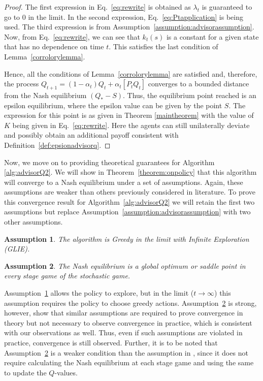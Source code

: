 \documentclass[jair, twoside,11pt,theapa]{article}
\newtheorem{assumption}{Assumption}
\begin{document}
\begin{proof}
The first expression in Eq.~\ref{eq:rewrite} is obtained as $\lambda_t$ is guaranteed to go to 0 in the limit. In the second expression, Eq.~\ref{eq:Ptapplication} is being used. The third expression is from Assumption~\ref{assumption:advisorassumption}. Now, from Eq.~\ref{eq:rewrite}, we can see that $k_t(s)$ is a constant for a given state that has no dependence on time $t$. This satisfies the last condition of Lemma~\ref{corrolorylemma}. 

Hence, all the conditions of Lemma~\ref{corrolorylemma} are satisfied and, therefore, the process $ Q_{t+1} = (1 - \alpha_t) Q_t + \alpha_t[P_t Q_t]$ converges to a bounded distance from the Nash equilibrium $(Q_{*} - S)$. Thus, the equilibrium point reached is an epsilon equilibrium, where the epsilon value can be given by the point $S$. The expression for this point is as given in Theorem \ref{maintheorem} with the value of $K$ being given in Eq.~\ref{eq:rewrite}. Here the agents can still unilaterally deviate and possibly obtain an additional payoff consistent with Definition~\ref{def:epsionadvisorq}.
\end{proof}




Now, we move on to providing theoretical guarantees for Algorithm \ref{alg:advisorQ2}. We will show in Theorem~\ref{theorem:onpolicy} that this algorithm will converge to a Nash equilibrium under a set of assumptions. Again, these assumptions are weaker than others previously considered in literature. To prove this convergence result for Algorithm~\ref{alg:advisorQ2} we will retain the first two assumptions but replace 
 Assumption~\ref{assumption:advisorassumption} with two other assumptions.  



\begin{assumption}\label{assumption:GLIE}
The algorithm is Greedy in the limit with Infinite Exploration (GLIE).
\end{assumption}





\begin{assumption}\label{assumption:globaloptimum}
The Nash equilibrium is a global optimum or saddle point in every stage game of the stochastic game. 
\end{assumption}

Assumption~\ref{assumption:GLIE} allows the policy to explore, but in the limit ($t \xrightarrow{} \infty$) this assumption requires the policy to choose greedy actions.  Assumption~\ref{assumption:globaloptimum} is strong, however, \cite{hu2003nash} show that similar assumptions are required to prove convergence in theory but not necessary to observe convergence in practice, which is consistent with our observations as well. Thus, even if such assumptions are violated in practice, convergence is still observed. Further, it is to be noted that Assumption~\ref{assumption:globaloptimum} is a 
weaker condition than the assumption in \citet{hu2003nash}, since it does not require calculating the Nash equilibrium at each stage game and using the same to update the $Q$-values.
\end{document}
